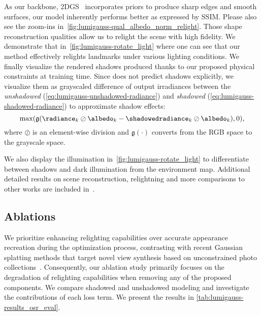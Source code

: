     
    As our backbone, 2DGS~\cite{huang20242d} incorporates priors to produce
    sharp edges and smooth surfaces, our model inherently performs better as
    expressed by SSIM.
    Please also see the zoom-ins
    in~\cref{fig:lumigauss-qual_albedo_norm_relight}.
    Those shape reconstruction qualities allow us to relight the scene with
    high fidelity.
    We demonstrate that in~\cref{fig:lumigauss-rotate_light} where one can see
    that our method effectively relights landmarks under various lighting
    conditions.
    We finally visualize the rendered shadows produced thanks to our proposed
    physical constraints at training time.
    Since \lumigauss does not predict shadows explicitly, we visualize them as grayscaled difference of output irradiances between the \textit{unshadowed} (\cref{eq:lumigauss-unshadowed-radiance}) and \textit{shadowed} (\cref{eq:lumigauss-shadowed-radiance}) to approximate shadow effects:
    \begin{equation}
      \max(\mathfrak{g}(\radiance_k \oslash \albedo_k - \shadowedradiance_k \oslash \albedo_k), 0),
    \end{equation}
    where $\oslash$ is an element-wise division and $\mathfrak{g}(\cdot)$ converts from the RGB space to the grayscale space.

    We also display the illumination in~\cref{fig:lumigauss-rotate_light} to
    differentiate between shadows and dark illumination from the environment
    map.
    Additional detailed results on scene reconstruction, relightning and more
    comparisons to other works are included in~\supplementary{}.

  \subsection{Ablations}

    We prioritize enhancing relighting capabilities over accurate appearance
    recreation during the optimization process, contrasting with recent
    Gaussian splatting methods that target novel view synthesis based on
    unconstrained photo
    collections~\cite{xu2024wildgs,dahmani2024swagsplattingwildimages,zhang2024gaussian}.
    Consequently, our ablation study primarily focuses on the degradation of
    relighting capabilities when removing any of the proposed components.
    We compare shadowed and unshadowed modeling and investigate the
    contributions of each loss term.
    We present the results in \cref{tab:lumigauss-results_osr_eval}.

